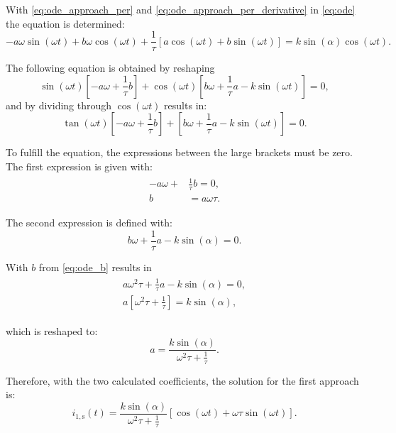 \begin{solutionblock}
  With \eqref{eq:ode_approach_per} and \eqref{eq:ode_approach_per_derivative} in \eqref{eq:ode} the equation is determined:
  \begin{equation}
    - a \omega \sin(\omega t) + b \omega \cos(\omega t) + \frac{1}{\tau} \left[a \cos(\omega t) + b \sin(\omega t)  \right]
    = k \sin(\alpha) \cos(\omega t).
  \end{equation}

  The following equation is obtained by reshaping
  \begin{equation}
    \sin(\omega t) \left[-a \omega + \frac{1}{\tau} b \right] + \cos(\omega t) \left[b\omega + \frac{1}{\tau} a - k \sin(\omega t) \right] = 0,
  \end{equation}
  and by dividing through $\cos(\omega t)$ results in:
  \begin{equation}
    \tan(\omega t) \left[-a \omega + \frac{1}{\tau} b \right] + \left[b \omega + \frac{1}{\tau}a - k \sin(\omega t) \right] = 0.
  \end{equation}

  To fulfill the equation, the expressions between the large brackets must be zero. 
  The first expression is given with:
  \begin{align}
    \begin{split}
      -a\omega + &\frac{1}{\tau}b = 0, \\
      b &= a \omega \tau.
      \label{eq:ode_b}
    \end{split}
  \end{align}

  The second expression is defined with:
  \begin{equation}
    b \omega + \frac{1}{\tau} a - k \sin(\alpha) = 0.
  \end{equation}

  With $b$ from \eqref{eq:ode_b} results in
  \begin{align}
    \begin{split}
      a \omega^2 \tau + \frac{1}{\tau} a - k \sin(\alpha) = 0, \\
      a \left[\omega^2 \tau + \frac{1}{\tau} \right] = k \sin(\alpha),
    \end{split}
  \end{align}

  which is reshaped to:
  \begin{equation}
    a = \frac{k \sin(\alpha)}{\omega^2 \tau + \frac{1}{\tau}}.
  \end{equation}

  Therefore, with the two calculated coefficients, the solution for the first approach is: 
  \begin{equation}
    i_{\mathrm{1,s}}(t) = \frac{k \sin(\alpha)}{\omega^2 \tau + \frac{1}{\tau}} \left[\cos(\omega t) + \omega \tau \sin(\omega t) \right].
  \end{equation}



\end{solutionblock}
